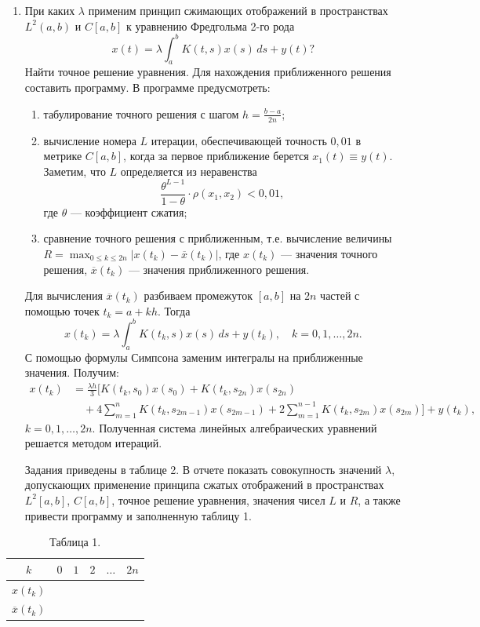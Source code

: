 \documentclass[12pt,a4paper]{article}
\begin{document}
\begin{enumerate}
\item При каких $\lambda$ применим принцип сжимающих отображений в пространствах $L^{2}(a,b)$ и $C[a,b]$ к уравнению Фредгольма 2-го рода
$$x(t)=\lambda\int_{a}^{b}K(t,s)x(s) \, ds+y(t) ?$$
Найти точное решение уравнения. Для нахождения приближенного решения составить программу. В программе предусмотреть:
\begin{enumerate}[label=\alph*)]
\item табулирование точного решения с шагом $h=\frac{b-a}{2n}$;
\item вычисление номера $L$ итерации, обеспечивающей точность $0,01$ в метрике $C[a,b]$, когда за первое приближение берется $x_{1}(t)\equiv y(t)$. Заметим, что $L$ определяется из неравенства
$$\frac{\theta^{L-1}}{1-\theta}\cdot\rho(x_{1},x_{2})<0,01,$$
где $\theta$ — коэффициент сжатия;
\item сравнение точного решения с приближенным, т.е. вычисление величины $R=\max_{0\le k\le2n}|x(t_{k})-\overline{x}(t_{k})|$, где $x(t_{k})$ — значения точного решения, $\overline{x}(t_{k})$ — значения приближенного решения.
\end{enumerate}
Для вычисления $\overline{x}(t_{k})$ разбиваем промежуток $[a,b]$ на $2n$ частей с помощью точек $t_{k}=a+kh$. Тогда
$$x(t_{k})=\lambda\int_{a}^{b}K(t_{k},s)x(s) \, ds+y(t_{k}), \quad k=0,1,\dots,2n.$$
С помощью формулы Симпсона заменим интегралы на приближенные значения. Получим:
\begin{align*}
x(t_{k}) &= \frac{\lambda h}{3} \Bigg[ K(t_{k},s_{0})x(s_{0}) + K(t_{k},s_{2n})x(s_{2n}) \\
&\quad + 4\sum_{m=1}^{n}K(t_{k},s_{2m-1})x(s_{2m-1}) + 2\sum_{m=1}^{n-1}K(t_{k},s_{2m})x(s_{2m}) \Bigg] + y(t_{k}),
\end{align*}
$k=0,1,\dots,2n$. Полученная система линейных алгебраических уравнений решается методом итераций.

Задания приведены в таблице 2. В отчете показать совокупность значений $\lambda$, допускающих применение принципа сжатых отображений в пространствах $L^{2}[a,b]$, $C[a,b]$, точное решение уравнения, значения чисел $L$ и $R$, а также привести программу и заполненную таблицу 1.
\end{enumerate}

\begin{table}[ht!]
\centering
\caption*{Таблица 1.}
\begin{tabular}{|c|c|c|c|c|}
\hline
$k$ & $0$ & $1$ & $2$ & $\dots \quad 2n$ \\
\hline
$x(t_{k})$ & & & & \\
\hline
$\overline{x}(t_{k})$ & & & & \\
\hline
\end{tabular}
\end{table}
\end{document}
